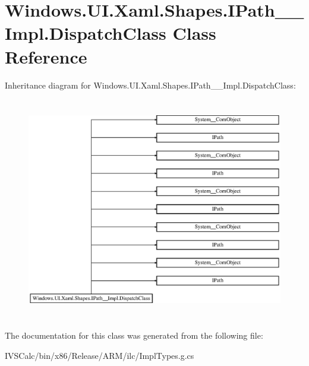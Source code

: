 \hypertarget{class_windows_1_1_u_i_1_1_xaml_1_1_shapes_1_1_i_path_____impl_1_1_dispatch_class}{}\section{Windows.\+U\+I.\+Xaml.\+Shapes.\+I\+Path\+\_\+\+\_\+\+Impl.\+Dispatch\+Class Class Reference}
\label{class_windows_1_1_u_i_1_1_xaml_1_1_shapes_1_1_i_path_____impl_1_1_dispatch_class}
Inheritance diagram for Windows.\+U\+I.\+Xaml.\+Shapes.\+I\+Path\+\_\+\+\_\+\+Impl.\+Dispatch\+Class\+:\begin{figure}[H]
\begin{center}
\leavevmode
\includegraphics[height=9.777778cm]{class_windows_1_1_u_i_1_1_xaml_1_1_shapes_1_1_i_path_____impl_1_1_dispatch_class}
\end{center}
\end{figure}


The documentation for this class was generated from the following file\+:\begin{DoxyCompactItemize}
\item 
I\+V\+S\+Calc/bin/x86/\+Release/\+A\+R\+M/ilc/Impl\+Types.\+g.\+cs\end{DoxyCompactItemize}
